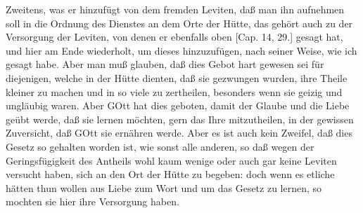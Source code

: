 Zweitens, was er hinzufügt von dem fremden Leviten, daß man ihn aufnehmen soll in die Ordnung des Dienstes an dem Orte der Hütte, das gehört auch zu der Versorgung der Leviten, von denen er ebenfalls oben [Cap. 14, 29.] gesagt hat, und hier am Ende wiederholt, um dieses hinzuzufügen, nach seiner Weise, wie ich gesagt habe. Aber man muß glauben, daß dies Gebot hart gewesen sei für diejenigen, welche in der Hütte dienten, daß sie gezwungen wurden, ihre Theile kleiner zu machen und in so viele zu zertheilen, besonders wenn sie geizig und ungläubig waren. Aber GOtt hat dies geboten, damit der Glaube und die Liebe geübt werde, daß sie lernen möchten, gern das Ihre mitzutheilen, in der gewissen Zuversicht, daß GOtt sie ernähren werde. Aber es ist auch kein Zweifel, daß dies Gesetz so gehalten worden ist, wie sonst alle anderen, so daß wegen der Geringsfügigkeit des Antheils wohl kaum wenige oder auch gar keine Leviten versucht haben, sich an den Ort der Hütte zu begeben: doch wenn es etliche hätten thun wollen aus Liebe zum Wort und um das Gesetz zu lernen, so mochten sie hier ihre Versorgung haben.

